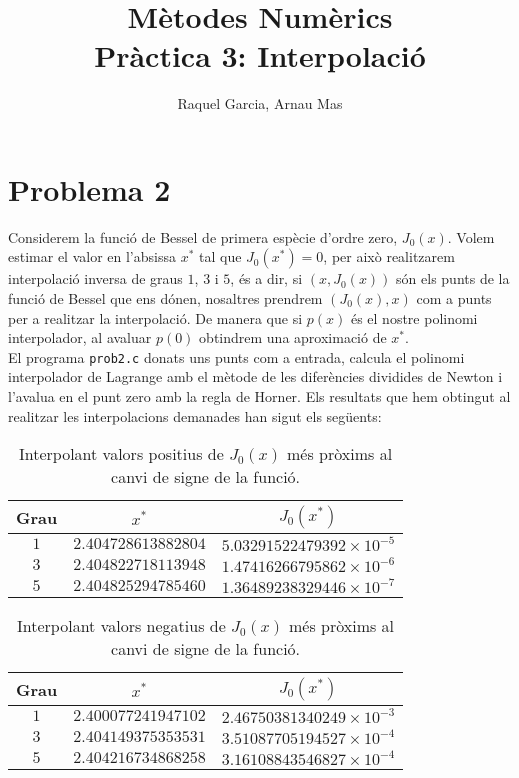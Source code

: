 \documentclass[12pt]{article}
\title{\textsf{\textbf{Mètodes Numèrics \\ Pràctica 3:} Interpolació}}
\author{\textsf{Raquel Garcia, Arnau Mas}}
\date{\textsf{}}
\begin{document}
	\maketitle
	\section*{Problema 2}
	Considerem la funció de Bessel de primera espècie d'ordre zero, $J_0(x)$. Volem estimar el valor en l'absissa $x^*$ tal que $J_0(x^*)=0$, per això realitzarem interpolació inversa de graus $1$, $3$ i $5$, és a dir, si $(x, J_0(x))$ són els punts de la funció de Bessel que ens dónen, nosaltres prendrem $(J_0(x), x)$ com a punts per a realitzar la interpolació. De manera que si $p(x)$ és el nostre polinomi interpolador, al avaluar $p(0)$ obtindrem una aproximació de $x^*$.\\
	
	El programa \texttt{prob2.c} donats uns punts com a entrada, calcula el polinomi interpolador de Lagrange amb el mètode de les diferències dividides de Newton i l'avalua en el punt zero amb la regla de Horner. Els resultats que hem obtingut al realitzar les interpolacions demanades han sigut els següents:
	
	\begin{table}[h!]
		\centering
		\caption{Interpolant valors positius de $J_0(x)$ més pròxims al canvi de signe de la funció.}	
		\begin{tabular}{c|c|c}
			Grau & $x^*$ &$J_0(x^*)$\\
			\hline
			\hline
			$1$ & $2.404728613882804$  &$5.03291522479392\times10^{-5}$\\
			$3$ & $2.404822718113948$ &$1.47416266795862\times10^{-6}$\\
			$5$ & $2.404825294785460$ &$1.36489238329446\times10^{-7}$\\
		\end{tabular}
	\end{table}
	
	\begin{table}[h!]
		\centering
		\caption{Interpolant valors negatius de $J_0(x)$ més pròxims al canvi de signe de la funció.}	
		\begin{tabular}{c|c|c}
			Grau & $x^*$ &$J_0(x^*)$\\
			\hline
			\hline
			$1$ & $2.400077241947102$&$2.46750381340249\times10^{-3}$\\
			$3$ & $2.404149375353531$&$3.51087705194527\times10^{-4}$\\
			$5$ &$2.404216734868258$ &$3.16108843546827\times10^{-4}$\\
		\end{tabular}
	\end{table}
	
\end{document}
